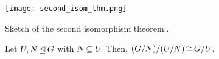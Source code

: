 \begin{marginfigure}
    \texttt{[image: second\_isom\_thm.png]}
    \caption{Sketch of the second isomorphism theorem..}\label{fig:second_isom_thm}
\end{marginfigure}

\begin{thm}
Let $U, N \operatorname*{\trianglelefteq} G$ with $N \subseteq U$. Then, $(G/N)/(U/N) \operatorname*{\cong} G/U$.
\end{thm}